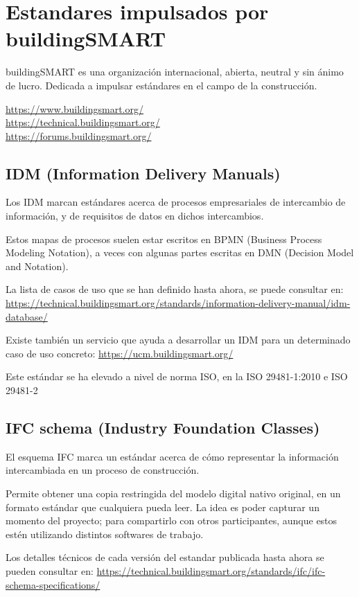 \documentclass[spanish,12pt,a4paper,final,oneside]{book}
\begin{document}
\section{Estandares impulsados por buildingSMART}
buildingSMART es una organización internacional, abierta, neutral y sin ánimo de lucro. Dedicada a impulsar estándares en el campo de la construcción.

\url{https://www.buildingsmart.org/}
\\ \url{https://technical.buildingsmart.org/}
\\ \url{https://forums.buildingsmart.org/}

\subsection{IDM (Information Delivery Manuals)}
Los IDM marcan estándares acerca de procesos empresariales de intercambio de información, y de requisitos de datos en dichos intercambios.

Estos mapas de procesos suelen estar escritos en BPMN (Business Process Modeling Notation), a veces con algunas partes escritas en DMN (Decision Model and Notation).

La lista de casos de uso que se han definido hasta ahora, se puede consultar en: \url{https://technical.buildingsmart.org/standards/information-delivery-manual/idm-database/}

Existe también un servicio que ayuda a desarrollar un IDM para un determinado caso de uso concreto: \url{https://ucm.buildingsmart.org/}

Este estándar se ha elevado a nivel de norma ISO, en la ISO 29481-1:2010 e ISO 29481-2



\subsection{IFC schema (Industry Foundation Classes)}
El esquema IFC marca un estándar acerca de cómo representar la información intercambiada en un proceso de construcción.

Permite obtener una copia restringida del modelo digital nativo original, en un formato estándar que cualquiera pueda leer. La idea es poder capturar un momento del proyecto; para compartirlo con otros participantes, aunque estos estén utilizando distintos softwares de trabajo. 

Los detalles técnicos de cada versión del estandar publicada hasta ahora se pueden consultar en: \url{https://technical.buildingsmart.org/standards/ifc/ifc-schema-specifications/}
\end{document}
